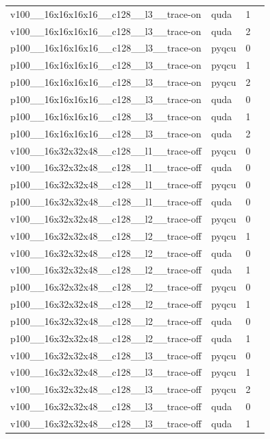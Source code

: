 \begin{table}[htbp]
\begin{tabular}{@{}llrr@{}}
v100\_\_16x16x16x16\_\_c128\_\_l3\_\_trace-on & quda & 1 &  \\
v100\_\_16x16x16x16\_\_c128\_\_l3\_\_trace-on & quda & 2 &  \\
p100\_\_16x16x16x16\_\_c128\_\_l3\_\_trace-on & pyqcu & 0 &  \\
p100\_\_16x16x16x16\_\_c128\_\_l3\_\_trace-on & pyqcu & 1 &  \\
p100\_\_16x16x16x16\_\_c128\_\_l3\_\_trace-on & pyqcu & 2 &  \\
p100\_\_16x16x16x16\_\_c128\_\_l3\_\_trace-on & quda & 0 &  \\
p100\_\_16x16x16x16\_\_c128\_\_l3\_\_trace-on & quda & 1 &  \\
p100\_\_16x16x16x16\_\_c128\_\_l3\_\_trace-on & quda & 2 &  \\
v100\_\_16x32x32x48\_\_c128\_\_l1\_\_trace-off & pyqcu & 0 &  \\
v100\_\_16x32x32x48\_\_c128\_\_l1\_\_trace-off & quda & 0 &  \\
p100\_\_16x32x32x48\_\_c128\_\_l1\_\_trace-off & pyqcu & 0 &  \\
p100\_\_16x32x32x48\_\_c128\_\_l1\_\_trace-off & quda & 0 &  \\
v100\_\_16x32x32x48\_\_c128\_\_l2\_\_trace-off & pyqcu & 0 &  \\
v100\_\_16x32x32x48\_\_c128\_\_l2\_\_trace-off & pyqcu & 1 &  \\
v100\_\_16x32x32x48\_\_c128\_\_l2\_\_trace-off & quda & 0 &  \\
v100\_\_16x32x32x48\_\_c128\_\_l2\_\_trace-off & quda & 1 &  \\
p100\_\_16x32x32x48\_\_c128\_\_l2\_\_trace-off & pyqcu & 0 &  \\
p100\_\_16x32x32x48\_\_c128\_\_l2\_\_trace-off & pyqcu & 1 &  \\
p100\_\_16x32x32x48\_\_c128\_\_l2\_\_trace-off & quda & 0 &  \\
p100\_\_16x32x32x48\_\_c128\_\_l2\_\_trace-off & quda & 1 &  \\
v100\_\_16x32x32x48\_\_c128\_\_l3\_\_trace-off & pyqcu & 0 &  \\
v100\_\_16x32x32x48\_\_c128\_\_l3\_\_trace-off & pyqcu & 1 &  \\
v100\_\_16x32x32x48\_\_c128\_\_l3\_\_trace-off & pyqcu & 2 &  \\
v100\_\_16x32x32x48\_\_c128\_\_l3\_\_trace-off & quda & 0 &  \\
v100\_\_16x32x32x48\_\_c128\_\_l3\_\_trace-off & quda & 1 &  \\

\end{tabular}
\end{table}
